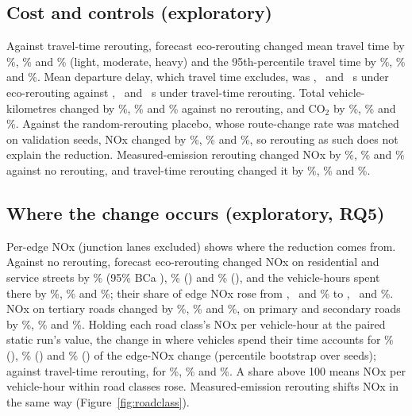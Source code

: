 \documentclass[11pt]{article}
\begin{document}
\subsection{Cost and controls (exploratory)}
Against travel-time rerouting, forecast eco-rerouting changed mean travel time by \EcoTTvsTTLight\%,
\EcoTTvsTTModerate\% and \EcoTTvsTTHeavy\% (light, moderate, heavy) and the 95th-percentile travel time by
\EcoPTTvsTTLight\%, \EcoPTTvsTTModerate\% and \EcoPTTvsTTHeavy\%. Mean departure delay, which travel time excludes,
was \DepartDelayEcoMlLight, \DepartDelayEcoMlModerate\ and \DepartDelayEcoMlHeavy~s under eco-rerouting against
\DepartDelayTtAdaptiveLight, \DepartDelayTtAdaptiveModerate\ and \DepartDelayTtAdaptiveHeavy~s under travel-time
rerouting. Total vehicle-kilometres changed by \EcoVkmVsStaticLight\%, \EcoVkmVsStaticModerate\% and
\EcoVkmVsStaticHeavy\% against no rerouting, and CO$_2$ by \EcoCOTwoVsStaticLight\%, \EcoCOTwoVsStaticModerate\% and
\EcoCOTwoVsStaticHeavy\%. Against the random-rerouting placebo, whose route-change rate was matched on validation
seeds, NOx changed by \EcoNOxVsPlaceboLight\%, \EcoNOxVsPlaceboModerate\% and \EcoNOxVsPlaceboHeavy\%, so rerouting
as such does not explain the reduction. Measured-emission rerouting changed NOx by \ReactiveNOxVsStaticLight\%,
\ReactiveNOxVsStaticModerate\% and \ReactiveNOxVsStaticHeavy\% against no rerouting, and travel-time rerouting
changed it by \TTNOxVsStaticLight\%, \TTNOxVsStaticModerate\% and \TTNOxVsStaticHeavy\%.

\subsection{Where the change occurs (exploratory, RQ5)}\label{sec:rq5}
Per-edge NOx (junction lanes excluded) shows where the reduction comes from. Against no rerouting, forecast
eco-rerouting changed NOx on residential and service streets by \ResidNOxLight\% (95\% BCa \ResidNOxCILight),
\ResidNOxModerate\% (\ResidNOxCIModerate) and \ResidNOxHeavy\% (\ResidNOxCIHeavy), and the vehicle-hours spent there by
\ResidVehHLight\%, \ResidVehHModerate\% and \ResidVehHHeavy\%; their share of edge NOx rose from
\ResidShareStaticLight, \ResidShareStaticModerate\ and \ResidShareStaticHeavy\% to \ResidShareEcoMlLight,
\ResidShareEcoMlModerate\ and \ResidShareEcoMlHeavy\%. NOx on tertiary roads changed by \TertiaryNOxLight\%,
\TertiaryNOxModerate\% and \TertiaryNOxHeavy\%, on primary and secondary roads by \PrimSecNOxLight\%,
\PrimSecNOxModerate\% and \PrimSecNOxHeavy\%. Holding each road class's NOx per vehicle-hour at the paired static
run's value, the change in where vehicles spend their time accounts for \CompositionLight\% (\CompositionCILight),
\CompositionModerate\% (\CompositionCIModerate) and \CompositionHeavy\% (\CompositionCIHeavy) of the edge-NOx
change (percentile bootstrap over seeds); against travel-time rerouting, for \CompositionVsTTLight\%,
\CompositionVsTTModerate\% and \CompositionVsTTHeavy\%. A share above 100 means NOx per vehicle-hour within road
classes rose. Measured-emission rerouting shifts NOx in the same way (Figure~\ref{fig:roadclass}).
\end{document}
